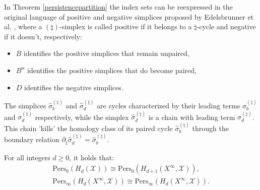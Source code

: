 \begin{remark}{\cite[\S 2, p.516]{Edelsbrunner2000}}
In Theorem \ref{persistencepartition} the index sets can be reexpressed in the original language of positive and negative simplices proposed by Edelsbrunner et al. \cite[p.8]{de2011dualities}, where a $(\natural)$-simplex is called positive if it belongs to a $\natural$-cycle and negative if it doesn't, respectively:
\begin{itemize}
	\item $B$ identifies the positive simplices that remain unpaired,
	\item $B^{\Join}$ identifies the positive simplices that do become paired,
	\item $D$ identifies the negative simplices.
\end{itemize}
The simplices $\hat{\sigma}^{(\natural)}_{b}$ and $\hat{\sigma}^{(\natural)}_{d}$ are cycles characterized by
their leading terms $\sigma^{(\natural)}_{b}$ and $\sigma^{(\natural)}_{d}$ respectively, while the simplex
$\hat{\sigma}^{(\natural)}_{d}$ is a chain with leading term $\sigma^{(\natural)}_{d}$. This chain 'kills'
the homology class of its paired cycle $\hat{\sigma}^{(\natural)}_{b}$ through the boundary relation
$\partial_{\natural} \hat{\sigma}^{(\natural)}_{d} = \hat{\sigma}^{(\natural)}_{b}$.
\end{remark}

\begin{theorem}{\cite[Proposition 2.4]{de2011dualities}}
	For all integers $d \geq 0$, it holds that:
	\begin{align*}
		\mathrm{Pers}_0(H_{d}(\mathcal{X})) \cong \mathrm{Pers}_0(H_{d+1}(X^\infty, \mathcal{X})), \nonumber\\
		\mathrm{Pers}_\infty(H_{d}(X^{\infty}, \mathcal{X})) \cong \mathrm{Pers}_\infty(H_{d}(X^{\infty}, \mathcal{X})).
	\end{align*}
\end{theorem}

